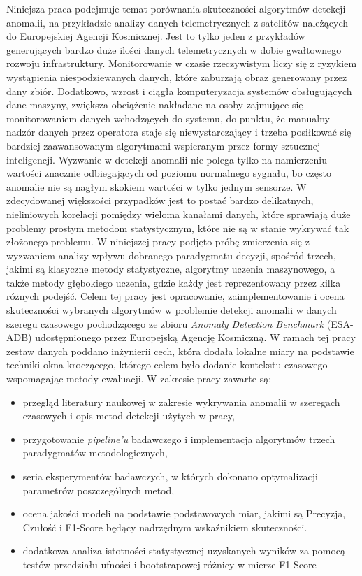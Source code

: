\documentclass[a4paper,twoside,12pt]{book}
\begin{document}
	Niniejsza praca podejmuje temat porównania skuteczności algorytmów detekcji anomalii, na przykładzie analizy danych telemetrycznych z satelitów należących do Europejskiej Agencji Kosmicznej. Jest to tylko jeden z przykładów generujących bardzo duże ilości danych telemetrycznych w dobie gwałtownego rozwoju infrastruktury. Monitorowanie w czasie rzeczywistym liczy się z ryzykiem wystąpienia niespodziewanych danych, które zaburzają obraz generowany przez dany zbiór. Dodatkowo, wzrost i ciągła komputeryzacja systemów obsługujących dane maszyny, zwiększa obciążenie nakładane na osoby zajmujące się monitorowaniem danych wchodzących do systemu, do punktu, że manualny nadzór danych przez operatora staje się niewystarczający i trzeba posiłkować się bardziej zaawansowanym algorytmami wspieranym przez formy sztucznej inteligencji. 
	Wyzwanie w detekcji anomalii nie polega tylko na namierzeniu wartości znacznie odbiegających od poziomu normalnego sygnału, bo często anomalie nie są nagłym skokiem wartości w tylko jednym sensorze. W zdecydowanej większości przypadków jest to postać bardzo delikatnych, nieliniowych korelacji pomiędzy wieloma kanałami danych, które sprawiają duże problemy prostym metodom statystycznym, które nie są w stanie wykrywać tak złożonego problemu. W niniejszej pracy podjęto próbę zmierzenia się z wyzwaniem analizy wpływu dobranego paradygmatu decyzji, spośród trzech, jakimi są klasyczne metody statystyczne, algorytmy uczenia maszynowego, a także metody głębokiego uczenia, gdzie każdy jest reprezentowany przez kilka różnych podejść. 
	Celem tej pracy jest opracowanie, zaimplementowanie i ocena skuteczności wybranych algorytmów w problemie detekcji anomalii w danych szeregu czasowego pochodzącego ze zbioru \textit{Anomaly Detection Benchmark} (ESA-ADB) udostępnionego przez Europejską Agencję Kosmiczną. W ramach tej pracy zestaw danych poddano inżynierii cech, która dodała lokalne miary na podstawie techniki okna kroczącego, którego celem było dodanie kontekstu czasowego wspomagając metody ewaluacji. 
	W zakresie pracy zawarte są:
	\begin{itemize}
		\item przegląd literatury naukowej w zakresie wykrywania anomalii w szeregach czasowych i opis metod detekcji użytych w pracy,
		\item przygotowanie \textit{pipeline'u} badawczego i implementacja algorytmów trzech paradygmatów metodologicznych,
		\item seria eksperymentów badawczych, w których dokonano optymalizacji parametrów poszczególnych metod,
		\item ocena jakości modeli na podstawie podstawowych miar, jakimi są Precyzja, Czułość i F1-Score będący nadrzędnym wskaźnikiem skuteczności.
		\item dodatkowa analiza istotności statystycznej uzyskanych wyników za pomocą testów przedziału ufności i bootstrapowej różnicy w mierze F1-Score
	\end{itemize}
\end{document}
